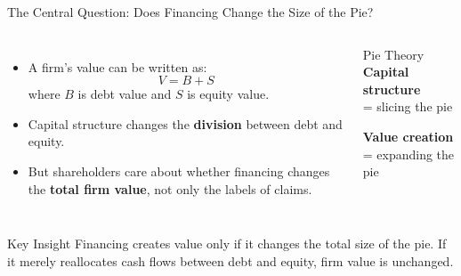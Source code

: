 \begin{frame}{The Central Question: Does Financing Change the Size of the Pie?}
\footnotesize
\begin{columns}
    \begin{itemize}
        \item A firm's value can be written as:
        \[
        V = B + S
        \]
        where $B$ is debt value and $S$ is equity value.
        
        \item Capital structure changes the \textbf{division} between debt and equity.
        
        \item But shareholders care about whether financing changes the \textbf{total firm value}, not only the labels of claims.
    \end{itemize}

    \begin{block}{Pie Theory}
    \centering
    \Large
    \textbf{Capital structure} \\
    = slicing the pie
    \vspace{0.3cm}
    
    \textbf{Value creation} \\
    = expanding the pie
    \end{block}
\end{columns}

\vfill

\begin{alertblock}{Key Insight}
Financing creates value only if it changes the total size of the pie.
If it merely reallocates cash flows between debt and equity, firm value is unchanged.
\end{alertblock}
\end{frame}

